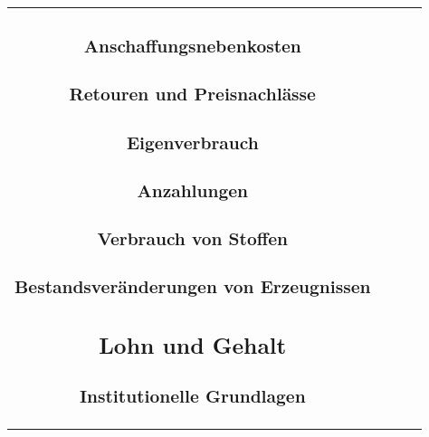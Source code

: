 \documentclass[paper=a4, fontsize=11pt]{scrartcl}
\numberwithin{equation}{section}
\numberwithin{figure}{section}
\numberwithin{table}{section}
\begin{document}
\begin{tabular}{cc|cc}

\subsubsection{Anschaffungsnebenkosten}


\subsubsection{Retouren und Preisnachlässe}


\subsubsection{Eigenverbrauch}


\subsubsection{Anzahlungen}


\subsubsection{Verbrauch von Stoffen}


\subsubsection{Bestandsveränderungen von Erzeugnissen}


\subsection{Lohn und Gehalt}


\subsubsection{Institutionelle Grundlagen}


\end{tabular}
\end{document}
